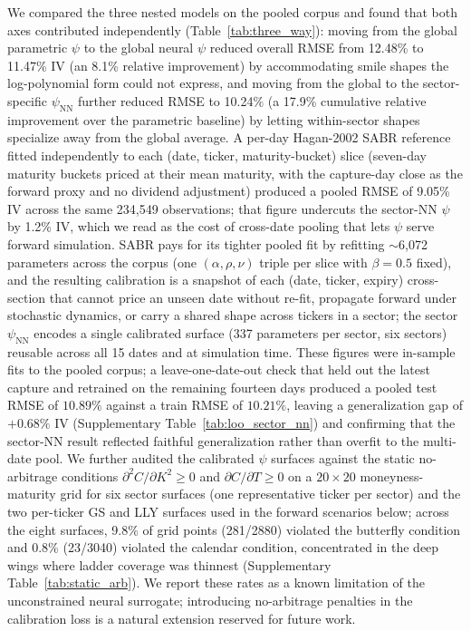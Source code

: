 We compared the three nested models on the pooled corpus and found that both axes contributed independently (Table~\ref{tab:three_way}): moving from the global parametric $\psi$ to the global neural $\psi$ reduced overall RMSE from 12.48\% to 11.47\% IV (an 8.1\% relative improvement) by accommodating smile shapes the log-polynomial form could not express, and moving from the global to the sector-specific $\psi_{\text{NN}}$ further reduced RMSE to 10.24\% (a 17.9\% cumulative relative improvement over the parametric baseline) by letting within-sector shapes specialize away from the global average. A per-day Hagan-2002 SABR reference fitted independently to each (date, ticker, maturity-bucket) slice (seven-day maturity buckets priced at their mean maturity, with the capture-day close as the forward proxy and no dividend adjustment) produced a pooled RMSE of 9.05\% IV across the same 234{,}549 observations; that figure undercuts the sector-NN $\psi$ by 1.2\% IV, which we read as the cost of cross-date pooling that lets $\psi$ serve forward simulation. SABR pays for its tighter pooled fit by refitting $\sim$6{,}072 parameters across the corpus (one $(\alpha,\rho,\nu)$ triple per slice with $\beta = 0.5$ fixed), and the resulting calibration is a snapshot of each (date, ticker, expiry) cross-section that cannot price an unseen date without re-fit, propagate forward under stochastic dynamics, or carry a shared shape across tickers in a sector; the sector $\psi_{\text{NN}}$ encodes a single calibrated surface (337 parameters per sector, six sectors) reusable across all 15 dates and at simulation time. These figures were in-sample fits to the pooled corpus; a leave-one-date-out check that held out the latest capture and retrained on the remaining fourteen days produced a pooled test RMSE of $10.89\%$ against a train RMSE of $10.21\%$, leaving a generalization gap of $+0.68\%$ IV (Supplementary Table~\ref{tab:loo_sector_nn}) and confirming that the sector-NN result reflected faithful generalization rather than overfit to the multi-date pool. We further audited the calibrated $\psi$ surfaces against the static no-arbitrage conditions $\partial^2 C/\partial K^2 \geq 0$ and $\partial C/\partial T \geq 0$ on a $20\times 20$ moneyness-maturity grid for six sector surfaces (one representative ticker per sector) and the two per-ticker GS and LLY surfaces used in the forward scenarios below; across the eight surfaces, 9.8\% of grid points (281/2880) violated the butterfly condition and 0.8\% (23/3040) violated the calendar condition, concentrated in the deep wings where ladder coverage was thinnest (Supplementary Table~\ref{tab:static_arb}). We report these rates as a known limitation of the unconstrained neural surrogate; introducing no-arbitrage penalties in the calibration loss is a natural extension reserved for future work.

